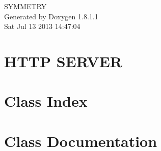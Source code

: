 \documentclass{book}
\begin{document}
\hypersetup{pageanchor=false,citecolor=blue}
\begin{titlepage}
\vspace*{7cm}
\begin{center}
{\Large S\-Y\-M\-M\-E\-T\-R\-Y }\\
\vspace*{1cm}
{\large Generated by Doxygen 1.8.1.1}\\
\vspace*{0.5cm}
{\small Sat Jul 13 2013 14:47:04}\\
\end{center}
\end{titlepage}
\clearemptydoublepage
{}
\tableofcontents
\clearemptydoublepage
{}
\hypersetup{pageanchor=true,citecolor=blue}
\chapter{H\-T\-T\-P S\-E\-R\-V\-E\-R}
\label{index}\hypertarget{index}{}
\chapter{Class Index}

\chapter{Class Documentation}









\printindex
\end{document}
